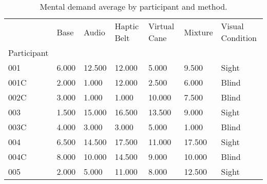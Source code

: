 
\begin{table}[!htb]
\centering
\caption{Mental demand average by participant and method.}
\label{tab:md_average}
\begin{tabular}{lllllll}
\toprule
{} &  Base &  Audio &  Haptic Belt &  Virtual Cane &  Mixture & Visual Condition \\
Participant &       &        &              &               &          &                  \\
\midrule
001         & 6.000 & 12.500 &       12.000 &         5.000 &    9.500 &            Sight \\
001C        & 2.000 &  1.000 &       12.000 &         2.500 &    6.000 &            Blind \\
002C        & 3.000 &  1.000 &        1.000 &        10.000 &    7.500 &            Blind \\
003         & 1.500 & 15.000 &       16.500 &        13.500 &    9.000 &            Sight \\
003C        & 4.000 &  3.000 &        3.000 &         5.000 &    1.000 &            Blind \\
004         & 6.500 & 14.500 &       17.500 &        11.000 &   17.500 &            Sight \\
004C        & 8.000 & 10.000 &       14.500 &         9.000 &   10.000 &            Blind \\
005         & 2.000 &  5.000 &       11.000 &         8.000 &   12.500 &            Sight \\
\bottomrule
\end{tabular}
\end{table}

